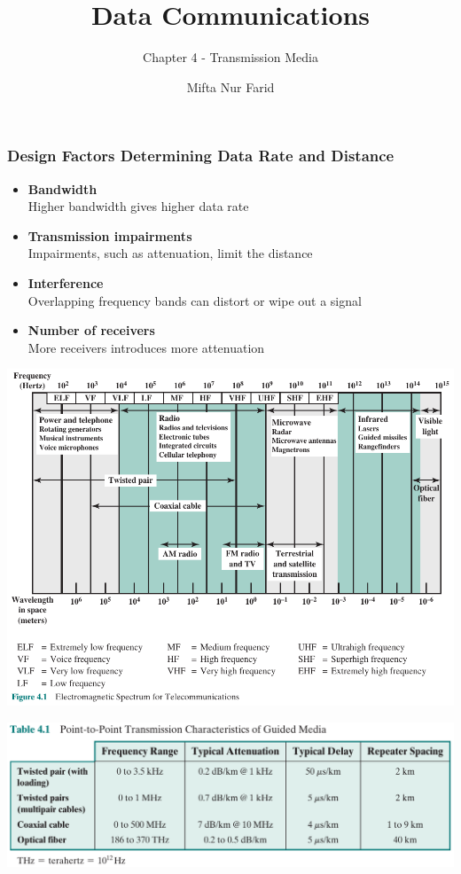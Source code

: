 \documentclass[pdflatex,compress]{beamer}
\title{Data Communications}
\subtitle{Chapter 4 - Transmission Media}
\author{Mifta Nur Farid}
\begin{document}
\maketitle

\begin{frame}
	\frametitle{Design Factors Determining Data Rate and Distance}
	\begin{itemize}
		\item \textbf{Bandwidth}\\
		Higher bandwidth gives higher data rate
		\item \textbf{Transmission impairments}\\
		Impairments, such as attenuation, limit the distance
		\item \textbf{Interference}\\
		Overlapping frequency bands can distort or wipe out a signal
		\item \textbf{Number of receivers}\\
		More receivers introduces more attenuation
	\end{itemize}
\end{frame}

\begin{frame}
	\begin{center}
		\includegraphics[width=0.9\linewidth]{img/img01}
	\end{center}
\end{frame}

\begin{frame}
	\begin{center}
		\includegraphics[width=\linewidth]{img/img02}
	\end{center}
\end{frame}
\end{document}
